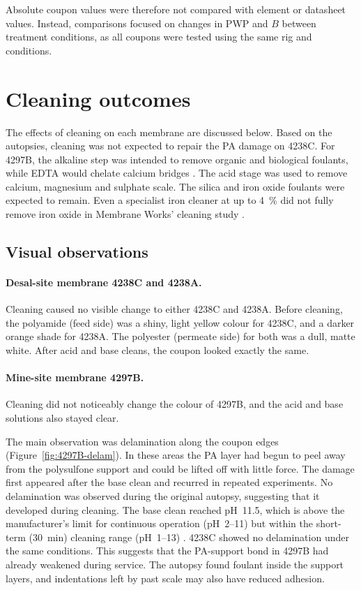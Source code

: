 Absolute coupon values were therefore not compared with element or datasheet values. Instead, comparisons focused on changes in PWP and $B$ between treatment conditions, as all coupons were tested using the same rig and conditions. 

\section{Cleaning outcomes}
\label{sec:res-cleaning}
The effects of cleaning on each membrane are discussed below. Based on the autopsies, cleaning was not expected to repair the PA damage on 4238C. For 4297B, the alkaline step was intended to remove organic and biological foulants, while EDTA would chelate calcium bridges \citep{Ang2006}. The acid stage was used to remove calcium, magnesium and sulphate scale. The silica and iron oxide foulants were expected to remain. Even a specialist iron cleaner at up to \qty{4}{\percent} did not fully remove iron oxide in Membrane Works' cleaning study \citep{MembraneWorks2026Mine}.


\subsection{Visual observations}
\paragraph{Desal-site membrane 4238C and 4238A. } 
Cleaning caused no visible change to either 4238C and 4238A. Before cleaning, the polyamide (feed side) was a shiny, light yellow colour for 4238C, and a darker orange shade for 4238A. The polyester (permeate side) for both was a dull, matte white. After acid and base cleans, the coupon looked exactly the same. 

\paragraph{Mine-site membrane 4297B.}
Cleaning did not noticeably change the colour of 4297B, and the acid and base solutions also stayed clear.

The main observation was delamination along the coupon edges (Figure~\ref{fig:4297B-delam}). In these areas the PA layer had begun to peel away from the polysulfone support and could be lifted off with little force. The damage first appeared after the base clean and recurred in repeated experiments. No delamination was observed during the original autopsy, suggesting that it developed during cleaning. The base clean reached pH~11.5, which is above the manufacturer's limit for continuous operation (pH~2--11) but within the short-term (\qty{30}{\minute}) cleaning range (pH~1--13) \citep{MembraneWorks2026Mine}. 4238C showed no delamination under the same conditions. This suggests that the PA-support bond in 4297B had already weakened during service. The autopsy found foulant inside the support layers, and indentations left by past scale may also have reduced adhesion.


